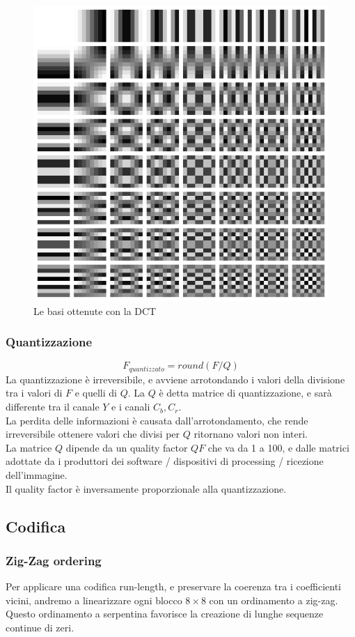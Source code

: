 \documentclass{report}
\begin{document}
	\begin{figure}[htp]
		\centering
		\includegraphics[width=0.5\linewidth]{dct.png}
		\caption{Le basi ottenute con la DCT}
	\end{figure}
		
	\subsubsection{Quantizzazione}
	$$
	F_{quantizzato}= round(F/Q)
	$$
	La quantizzazione è irreversibile, e avviene arrotondando i valori della divisione tra i valori di $F$ e quelli di $Q$. La $Q$ è detta matrice di quantizzazione, e sarà differente tra il canale $Y$ e i canali $C_b,C_r$.\\
	La perdita delle informazioni è causata dall'arrotondamento, che rende irreversibile ottenere valori che divisi per $Q$ ritornano valori non interi.\\
	La matrice $Q$ dipende da un quality factor $QF$ che va da 1 a 100, e dalle matrici adottate da i produttori dei software / dispositivi di processing / ricezione dell'immagine.\\
	Il quality factor è inversamente proporzionale alla quantizzazione.
		
	\subsection{Codifica}
		
	\subsubsection{Zig-Zag ordering}
	Per applicare una codifica run-length, e preservare la coerenza tra i coefficienti vicini, andremo a linearizzare ogni blocco $8\times 8$ con un ordinamento a zig-zag.\\ Questo ordinamento a serpentina favorisce la creazione di lunghe sequenze continue di zeri.
		
\end{document}
